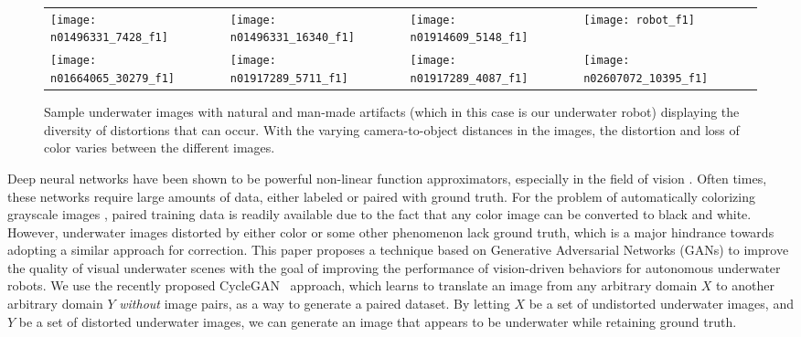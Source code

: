 \begin{figure}[h]
\centering
\begin{tabular}{p{1.6cm} p{1.6cm} p{1.6cm} p{1.7cm}}
   \texttt{[image: n01496331\_7428\_f1]} &
   \texttt{[image: n01496331\_16340\_f1]} &
   \texttt{[image: n01914609\_5148\_f1]} &
   \texttt{[image: robot\_f1]} \\
   \texttt{[image: n01664065\_30279\_f1]} &
   \texttt{[image: n01917289\_5711\_f1]} &
   \texttt{[image: n01917289\_4087\_f1]} &
   \texttt{[image: n02607072\_10395\_f1]} \\
\end{tabular}
\label{fig:samples}
\vspace{-2mm}
\caption{Sample underwater images with natural and man-made artifacts (which in this case is our underwater robot) displaying the 
diversity of distortions that can occur. With the varying camera-to-object distances in the images, the distortion and loss of 
color varies between the different images.}
\end{figure}

Deep neural networks have been shown to be powerful non-linear function approximators, especially in the field of vision 
\cite{krizhevsky2012imagenet}. Often times, these networks require large amounts of data, either labeled or paired with
ground truth. For the problem of automatically colorizing grayscale images \cite{zhang2016colorful}, paired training
data is
readily available due to the fact that any color image can be converted to black and white. However, underwater images distorted 
by either
color or some other phenomenon lack ground truth, which is a major hindrance towards adopting a similar approach for correction. 
This paper proposes a technique based on Generative Adversarial Networks (GANs) to improve the quality of visual underwater scenes 
with the goal of improving the performance of vision-driven behaviors for autonomous underwater robots.
We use the recently proposed CycleGAN~\cite{zhu2017unpaired} approach, which learns to translate an image from any arbitrary 
domain $X$ to another arbitrary domain $Y$ \textit{without} image pairs, as a way to generate a paired dataset.
By letting $X$ be a set of undistorted underwater images, and
$Y$ be a set of distorted underwater images, we can generate an image that appears to be underwater while retaining
ground truth.
